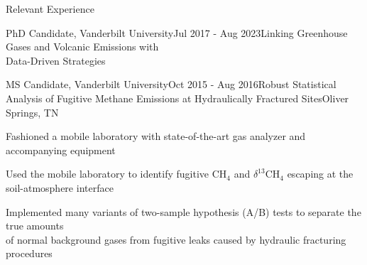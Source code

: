 \documentclass{resume} %
\newcommand{\commentblock}[1]{}
\begin{document}
\begin{rSection}{Relevant Experience}
\begin{rSubsection}{PhD Candidate, Vanderbilt University}{Jul 2017 - Aug 2023}{Linking Greenhouse Gases and Volcanic Emissions with \\ Data-Driven Strategies}{}
    \end{rSubsection}

    \begin{rSubsection}{MS Candidate, Vanderbilt University}{Oct 2015 - Aug 2016}{Robust Statistical Analysis of Fugitive Methane Emissions at Hydraulically Fractured Sites}{Oliver Springs, TN}
        \item {Fashioned a mobile laboratory with state-of-the-art gas analyzer and accompanying equipment}
        \item {Used the mobile laboratory to identify fugitive CH$_4$ and $\delta^{13}$CH$_4$ escaping at the soil-atmosphere interface}
        \item {Implemented many variants of two-sample hypothesis (A/B) tests to separate the true amounts \\ of normal background gases from fugitive leaks caused by hydraulic fracturing procedures}
    
    \end{rSubsection}

    
    \commentblock{
        \item{NLP Classification of Legislature to Distinguish Relevant from Irrelevant to the Business and Clients}    
        \vspace{-0.5em}
        \subitem{$\cdot$ Accessing a previously made database of regulations spanning American to Polish law ($\ge$ 100k regulations), \\ NLP and ML supervised techniques were used to classify legislature from around the world that is and \\ not relevant to the company and its clients}
        \vspace{-0.5em}
        \subitem{$\cdot$ As project leader, provided the road map and developed the codebase to permit the preprocessing, \\ exploration, optimization, visualization, and interpretation of the algorithms used to delineate relevant from \\ irrelevant legislature}
        \vspace{-0.5em}
        \subitem{$\cdot$ These techniques will reduce the demand for humans to review the regulations by \\ hundreds of hours.}
        \vspace{-0.5em}
        \subitem{$\cdot$ Will lead the deployment and maintenance of the product within the Azure ecosystem in 2022.}
        \vspace{0.25em}

}
\end{rSection}
\end{document}
